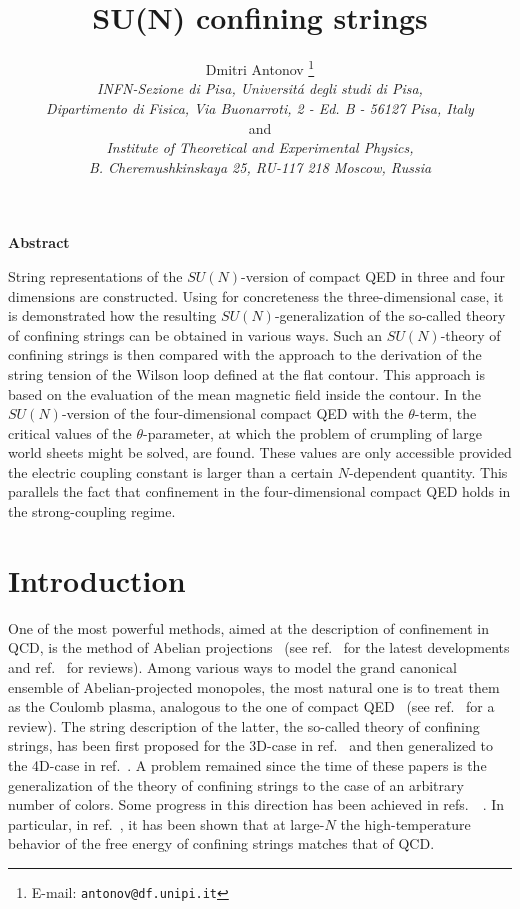 \documentclass[a4paper,12pt]{article}
\title{
\vspace{-3mm}
\rightline{\small IFUP-TH 2003/17}
\vspace{8mm}
\bf SU(N) confining strings}
\author{Dmitri Antonov
\thanks{E-mail: {\tt antonov@df.unipi.it}}
\\
{\it INFN-Sezione di Pisa, Universit\'a degli studi di Pisa,}\\
{\it Dipartimento di Fisica, Via Buonarroti, 2 - Ed. B - 56127 Pisa, Italy}\\
and\\
{\it Institute of Theoretical and Experimental Physics,}\\
{\it B. Cheremushkinskaya 25, RU-117 218 Moscow, Russia}}
\date{}
\begin{document}
\maketitle
\vspace{1mm}
\centerline{\bf {Abstract}}
\vspace{3mm}
\noindent
String representations of the $SU(N)$-version of compact QED in three and four dimensions are constructed.
Using for concreteness
the three-dimensional case, it is demonstrated how the resulting $SU(N)$-generalization
of the so-called theory of confining strings can be
obtained in various ways. Such an $SU(N)$-theory of confining strings is then compared
with the approach to the derivation of the string tension of the Wilson loop defined at the flat contour. This approach is
based on the evaluation of the mean magnetic field inside the contour.
In the $SU(N)$-version of the four-dimensional compact QED with the $\theta$-term,
the critical values of the $\theta$-parameter, at which the problem of crumpling of large world sheets might be solved, are found.
These values are only accessible provided the electric coupling constant is larger than a certain $N$-dependent quantity. This
parallels the fact that confinement in the four-dimensional compact QED holds in the strong-coupling regime.


\newpage

\section{Introduction}
One of the most powerful methods, aimed at the description of confinement in QCD, is the method
of Abelian projections~\cite{th} (see ref.~\cite{suN} for the latest developments and ref.~\cite{digiacomo} for reviews). Among various ways to
model the grand canonical ensemble of Abelian-projected monopoles, the most natural one is
to treat them as the Coulomb plasma, analogous to the one of compact QED~\cite{polpl} (see ref.~\cite{dg} for a review). The string description
of the latter, the so-called theory of confining strings, has been first proposed
for the 3D-case in ref.~\cite{pol} and then generalized to the 4D-case in ref.~\cite{cristina}.
A problem remained since the time of these papers is the generalization of the theory of confining strings
to the case of an arbitrary number of
colors. Some progress in this direction has been achieved in refs.~~\cite{suN1, suN2}. In particular, in ref.~\cite{suN1}, it has been
shown that at large-$N$
the high-temperature behavior of the free energy of confining strings matches that of QCD.
\end{document}
